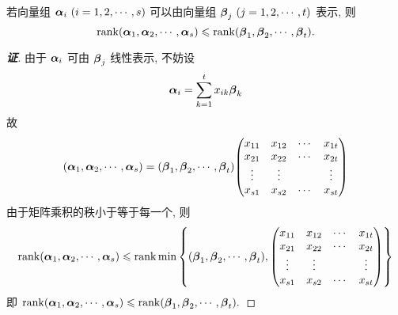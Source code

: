 \begin{theorem}
    若向量组 $\vb*{\alpha}_i~ (i=1,2,\cdots,s)$ 可以由向量组 $\vb*{\beta}_j~ (j=1,2,\cdots,t)$ 表示, 则
    $$\rank(\vb*{\alpha}_1,\vb*{\alpha}_2,\cdots,\vb*{\alpha}_s)\leqslant \rank(\vb*{\beta}_1,\vb*{\beta}_2,\cdots,\vb*{\beta}_t).$$
\end{theorem}
\begin{proof}[{\songti \textbf{证}}]
    由于 $\vb*{\alpha}_i$ 可由 $\vb*{\beta}_j$ 线性表示, 不妨设 $$\vb*{\alpha}_i=\sum_{k=1}^{t}x_{ik}\vb*{\beta}_k$$
    故 $$(\vb*{\alpha}_1,\vb*{\alpha}_2,\cdots,\vb*{\alpha}_s)=(\vb*{\beta}_1,\vb*{\beta}_2,\cdots,\vb*{\beta}_t)\mqty(x_{11}&x_{12}&\cdots&x_{1t}\\x_{21}&x_{22}&\cdots&x_{2t}\\\vdots &\vdots&&\vdots\\x_{s1}&x_{s2}&\cdots&x_{st})$$
    由于矩阵乘积的秩小于等于每一个, 则
    $$\rank(\vb*{\alpha}_1,\vb*{\alpha}_2,\cdots,\vb*{\alpha}_s)\leqslant \rank\min\qty{(\vb*{\beta}_1,\vb*{\beta}_2,\cdots,\vb*{\beta}_t),\mqty(x_{11}&x_{12}&\cdots&x_{1t}\\x_{21}&x_{22}&\cdots&x_{2t}\\\vdots &\vdots&&\vdots\\x_{s1}&x_{s2}&\cdots&x_{st})}$$
    即 $\rank(\vb*{\alpha}_1,\vb*{\alpha}_2,\cdots,\vb*{\alpha}_s)\leqslant \rank(\vb*{\beta}_1,\vb*{\beta}_2,\cdots,\vb*{\beta}_t).$
\end{proof}
